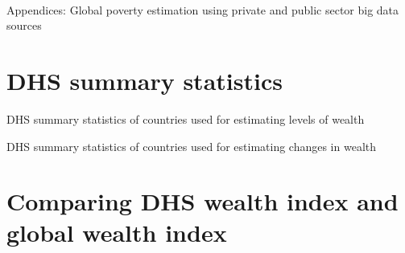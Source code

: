 \documentclass{article}
\begin{document}
\renewcommand{\thepage}{S\arabic{page}} 
\renewcommand{\thesection}{S\arabic{section}}  
\renewcommand{\thetable}{S\arabic{table}}  
\renewcommand{\thefigure}{S\arabic{figure}}

\thispagestyle{empty}
\begin{center}
~~ \\ 
\bigskip 
\bigskip 
\bigskip 
\bigskip 
\bigskip 
\bigskip 
\bigskip 
\bigskip 
\bigskip 
\bigskip 
\bigskip 
\bigskip 
\bigskip 
\bigskip 
    \Huge Appendices: Global poverty estimation using private and public sector big data sources \\
    \bigskip
    \bigskip
    \bigskip
    \Huge 
\end{center}
    \bigskip
    \bigskip
    \bigskip
    \bigskip
    \bigskip
    \bigskip
    \bigskip
    \bigskip
    \bigskip
    \bigskip
    \bigskip
    \bigskip
    \bigskip
    \bigskip
    \bigskip
    \bigskip
    \bigskip
    \bigskip
    \bigskip
    \bigskip
    \bigskip
    \bigskip
    \bigskip

\newpage
\tableofcontents

\newpage
\doublespacing
\section{DHS summary statistics}

\singlespacing
\begin{table}[H]
\small
\caption{DHS summary statistics of countries used for estimating levels of wealth}
\label{tab:dhs_summary_table}
\centering

\end{table}
\normalsize
\doublespacing

\singlespacing
\begin{table}[H]
\small
\caption{DHS summary statistics of countries used for estimating changes in wealth}
\label{tab:dhs_summary_table_changes}
\centering

\end{table}
\normalsize
\doublespacing

\newpage
\section{Comparing DHS wealth index and global wealth index}
\label{si:comparing_dhs_global_wi}
\end{document}
